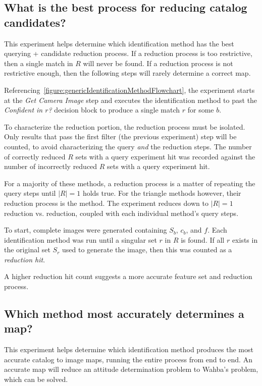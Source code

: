 \subsection{What is the best process for reducing catalog candidates?}\label{subsec:candidateReductionMethods}
This experiment helps determine which identification method has the best querying + candidate reduction process.
If a reduction process is too restrictive, then a single match in $R$ will never be found.
If a reduction process is not restrictive enough, then the following steps will rarely determine a correct map.

Referencing~\autoref{figure:genericIdentificationMethodFlowchart}, the experiment starts at the \textit{Get Camera
Image} step and executes the identification method to past the \textit{Confident in $r$?} decision block to produce a
single match $r$ for some $b$.

To characterize the reduction portion, the reduction process must be isolated.
Only results that pass the first filter (the previous experiment) step will be counted, to avoid characterizing the
query \textit{and} the reduction steps.
The number of correctly reduced $R$ sets with a query experiment hit was recorded against the number of incorrectly
reduced $R$ sets with a query experiment hit.

For a majority of these methods, a reduction process is a matter of repeating the query steps until $|R|=1$ holds true.
For the triangle methods however, their reduction process is the  method.
The experiment reduces down to $|R|=1$ reduction vs.  reduction, coupled with each individual method's
query steps.

To start, complete images were generated containing $S_b$, $c_b$, and $f$.
Each identification method was run until a singular set $r$ in $R$ is found.
If all $r$ exists in the original set $S_r$ used to generate the image, then this was counted as a
\textit{reduction hit}.

A higher reduction hit count suggests a more accurate feature set and reduction process.

\subsection{Which method most accurately determines a map?}\label{subsec:identificationMethods}
This experiment helps determine which identification method produces the most accurate catalog to image maps, running
the entire process from end to end.
An accurate map will reduce an attitude determination problem to Wahba's problem, which can be solved.

